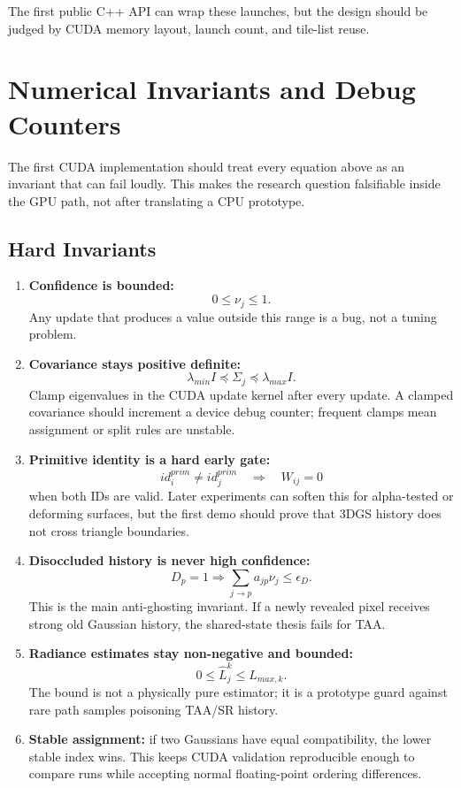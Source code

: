 \documentclass[11pt]{article}
\begin{document}
The first public C++ API can wrap these launches, but the design should be
judged by CUDA memory layout, launch count, and tile-list reuse.

\section{Numerical Invariants and Debug Counters}

The first CUDA implementation should treat every equation above as an invariant
that can fail loudly. This makes the research question falsifiable inside the
GPU path, not after translating a CPU prototype.

\subsection{Hard Invariants}

\begin{enumerate}
  \item \textbf{Confidence is bounded:}
  \[
    0 \leq \nu_j \leq 1.
  \]
  Any update that produces a value outside this range is a bug, not a tuning
  problem.

  \item \textbf{Covariance stays positive definite:}
  \[
    \lambda_{min} I \preceq \Sigma_j \preceq \lambda_{max} I.
  \]
  Clamp eigenvalues in the CUDA update kernel after every update. A clamped
  covariance should increment a device debug counter; frequent clamps mean
  assignment or split rules are unstable.

  \item \textbf{Primitive identity is a hard early gate:}
  \[
    id_i^{prim}\neq id_j^{prim}
    \quad\Rightarrow\quad
    W_{ij}=0
  \]
  when both IDs are valid. Later experiments can soften this for alpha-tested
  or deforming surfaces, but the first demo should prove that 3DGS history does
  not cross triangle boundaries.

  \item \textbf{Disoccluded history is never high confidence:}
  \[
    D_p=1 \Rightarrow \sum_{j\rightarrow p} a_{jp}\nu_j \leq \epsilon_D.
  \]
  This is the main anti-ghosting invariant. If a newly revealed pixel receives
  strong old Gaussian history, the shared-state thesis fails for TAA.

  \item \textbf{Radiance estimates stay non-negative and bounded:}
  \[
    0 \leq \hat{L}_j^k \leq L_{max,k}.
  \]
  The bound is not a physically pure estimator; it is a prototype guard against
  rare path samples poisoning TAA/SR history.

  \item \textbf{Stable assignment:} if two Gaussians have equal compatibility,
  the lower stable index wins. This keeps CUDA validation reproducible enough
  to compare runs while accepting normal floating-point ordering differences.
\end{enumerate}
\end{document}
